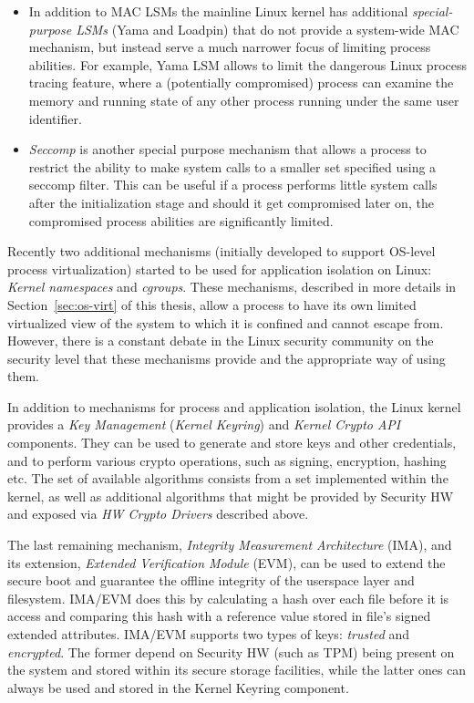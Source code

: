 \begin{itemize}
	\item In addition to MAC LSMs the mainline Linux kernel has additional \textit{special-purpose LSMs} (Yama and Loadpin) that do not provide a system-wide MAC mechanism, but instead serve a much narrower focus of limiting process abilities. For example, Yama LSM allows to limit the dangerous Linux process tracing feature, where a (potentially compromised) process can examine the memory and running state of any other process running under the same user identifier. 
	\item \textit{Seccomp} is another special purpose mechanism that allows a process to restrict the ability to make system calls to a smaller set specified using a seccomp filter. This can be useful if a process performs little system calls after the initialization stage and should it get compromised later on, the compromised process abilities are significantly limited.
\end{itemize} 

Recently two additional mechanisms (initially developed to support OS-level process virtualization) started to be used for application isolation on Linux: \textit{Kernel namespaces} and \textit{cgroups}. These mechanisms, described in more details in Section~\ref{sec:os-virt} of this thesis, allow a process to have its own limited virtualized view of the system to which it is confined and cannot escape from. However, there is a constant debate in the Linux security community on the security level that these mechanisms provide and the appropriate way of using them.   

In addition to mechanisms for process and application isolation, the Linux kernel provides a \textit{Key Management} (\textit{Kernel Keyring}) and \textit{Kernel Crypto API} components. They can be used to generate and store keys and other credentials, and to perform various crypto operations, such as signing, encryption, hashing etc. The set of available algorithms consists from a set implemented within the kernel, as well as additional algorithms that might be provided by Security HW and exposed via \textit{HW Crypto Drivers} described above.

The last remaining mechanism, \textit{Integrity Measurement Architecture} (IMA), and its extension, \textit{Extended Verification Module} (EVM), can be used to extend the secure boot and guarantee the offline integrity of the userspace layer and filesystem. IMA/EVM does this by calculating a hash over each file before it is access and comparing this hash with a reference value stored in file's signed extended attributes. IMA/EVM supports two types of keys: \textit{trusted} and \textit{encrypted}. The former depend on Security HW (such as TPM) being present on the system and stored within its secure storage facilities, while the latter ones can always be used and stored in the Kernel Keyring component. 

